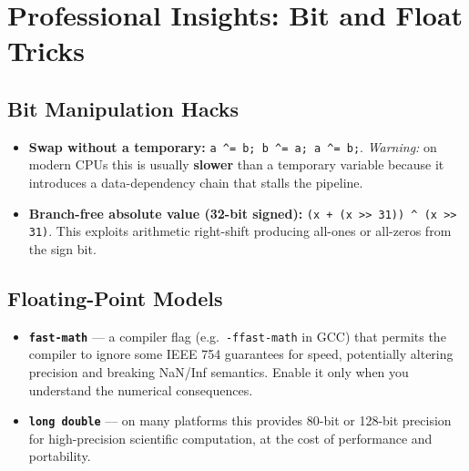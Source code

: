 \section{Professional Insights: Bit and Float Tricks}
\label{sec:bit-float-tricks}

\subsection{Bit Manipulation Hacks}

\begin{itemize}
    \item \textbf{Swap without a temporary:} \texttt{a \^{}= b; b \^{}= a; a \^{}= b;}. \textit{Warning:} on modern CPUs this is usually \textbf{slower} than a temporary variable because it introduces a data-dependency chain that stalls the pipeline.
    \item \textbf{Branch-free absolute value (32-bit signed):} \texttt{(x + (x >> 31)) \^{} (x >> 31)}. This exploits arithmetic right-shift producing all-ones or all-zeros from the sign bit.
\end{itemize}

\subsection{Floating-Point Models}

\begin{itemize}
    \item \textbf{\texttt{fast-math}} --- a compiler flag (e.g.\ \texttt{-ffast-math} in GCC) that permits the compiler to ignore some IEEE 754 guarantees for speed, potentially altering precision and breaking NaN/Inf semantics. Enable it only when you understand the numerical consequences.
    \item \textbf{\texttt{long double}} --- on many platforms this provides 80-bit or 128-bit precision for high-precision scientific computation, at the cost of performance and portability.
\end{itemize}
